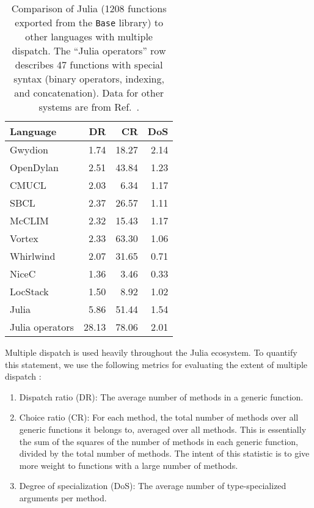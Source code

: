 \documentclass[preprint]{sigplanconf}
\newcommand{\code}[1]{\texttt{#1}}
\begin{document}
\begin{table}
\label{dispatchratios}
\begin{center}
\begin{tabular}{|l|r|r|r|}\hline
Language & DR & CR & DoS \\
\hline \hline
Gwydion    & 1.74 & 18.27 & 2.14 \\
\hline
OpenDylan  & 2.51 & 43.84 & 1.23 \\
\hline
CMUCL      & 2.03 &  6.34 & 1.17 \\
\hline
SBCL       & 2.37 & 26.57 & 1.11 \\
\hline
McCLIM     & 2.32 & 15.43 & 1.17 \\
\hline
Vortex     & 2.33 & 63.30 & 1.06 \\
\hline
Whirlwind  & 2.07 & 31.65 & 0.71 \\
\hline
NiceC      & 1.36 &  3.46 & 0.33 \\
\hline
LocStack   & 1.50 &  8.92 & 1.02 \\
\hline
Julia      & 5.86 & 51.44 & 1.54 \\
\hline
Julia operators & 28.13 & 78.06 & 2.01 \\
\hline
\end{tabular}
\end{center}
\caption{
Comparison of Julia (1208 functions exported from the \code{Base} library)
to other languages with multiple dispatch.
The ``Julia operators'' row describes 47 functions with special syntax
(binary operators, indexing, and concatenation).
Data for other systems are from Ref.~\cite{Muschevici:2008}.
}
\end{table}

Multiple dispatch is used heavily throughout the Julia ecosystem. To quantify
this statement, we use the following metrics for evaluating the extent of 
multiple dispatch \cite{Muschevici:2008}:

\begin{enumerate}
\item Dispatch ratio (DR): The average number of methods in a generic function.
\item Choice ratio (CR): For each method, the total number of methods over all
generic functions it belongs to, averaged over all methods. This is essentially
the sum of the squares of the number of methods in each generic function, divided
by the total number of methods. The intent of this statistic is to give more weight
to functions with a large number of methods.
\item Degree of specialization (DoS): The average number of type-specialized
arguments per method.
\end{enumerate}
\end{document}
